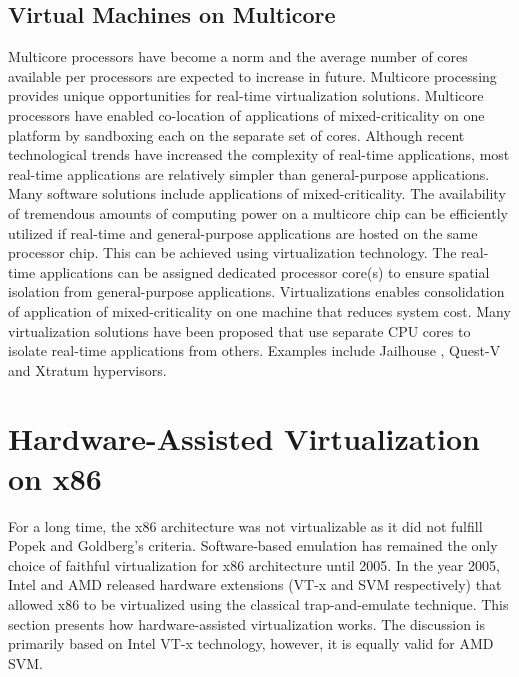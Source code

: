 
\subsection{Virtual Machines on Multicore}
Multicore processors have become a norm and the average number of cores available per processors are expected to increase in future.
Multicore processing provides unique opportunities for real-time virtualization solutions.
Multicore processors have enabled co-location of applications of mixed-criticality on one platform by sandboxing each on the separate set of cores.
Although recent technological trends have increased the complexity of real-time applications, most real-time applications are relatively simpler than general-purpose applications.
Many software solutions include applications of mixed-criticality.
The availability of tremendous amounts of computing power on a multicore chip can be efficiently utilized if real-time
and general-purpose applications are hosted on the same processor chip. This can be achieved using virtualization technology.
The real-time applications can be assigned dedicated processor core(s) to ensure spatial isolation from general-purpose applications.
Virtualizations enables consolidation of application of mixed-criticality on one machine that reduces system cost.
Many virtualization solutions have been proposed that use separate CPU cores to isolate real-time applications
from others. Examples include Jailhouse \cite{jailhouse}, Quest-V \cite{West:2016:VSK:2966277.2935748} and Xtratum \cite {Carrascosa:2014:XHR:2668138.2668142} hypervisors.


\section{Hardware-Assisted Virtualization on x86}
For a long time, the x86 architecture was not virtualizable as it did not fulfill Popek and Goldberg's criteria.
Software-based emulation has remained the only choice of faithful virtualization for x86 architecture until 2005.
In the year 2005, Intel \cite{uhlig2005intel} and AMD released hardware extensions (VT-x and SVM respectively) that allowed x86 to be virtualized using the classical trap-and-emulate technique.
This section presents how hardware-assisted virtualization works.
The discussion is primarily based on Intel VT-x technology, however, it is equally valid for AMD SVM.

